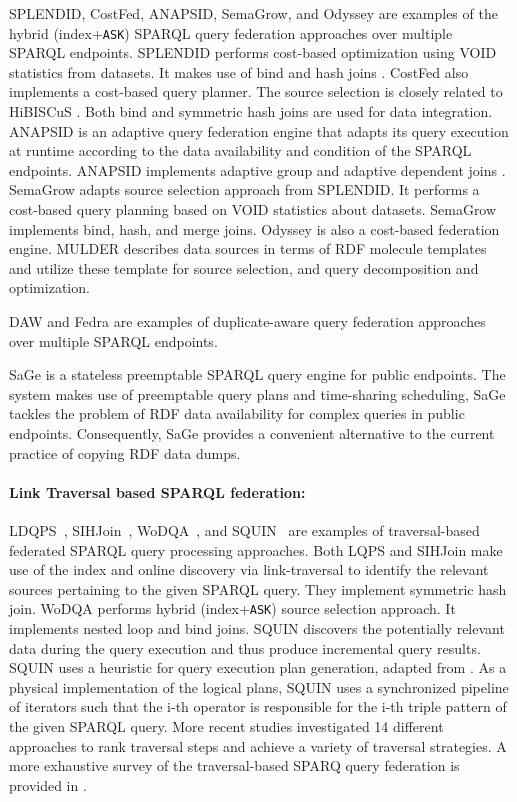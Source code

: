 SPLENDID, CostFed, ANAPSID, SemaGrow, and Odyssey are examples of the hybrid (index+\texttt{ASK}) SPARQL query federation approaches over multiple SPARQL endpoints. SPLENDID performs cost-based optimization using VOID statistics from datasets. It makes use of bind and hash joins \cite{saleem2015fine}. %
CostFed also implements a cost-based query planner. The source selection is closely related to HiBISCuS \cite{hibiscus2014}. Both bind and symmetric hash joins are used for data integration. ANAPSID \cite{anapsid2011} is an adaptive query federation engine that adapts its query execution at runtime according to the data availability and condition of the SPARQL endpoints.  ANAPSID implements adaptive group and adaptive dependent joins \cite{saleem2015fine}. SemaGrow adapts source selection approach from SPLENDID. It performs a cost-based query planning based on VOID statistics about datasets. SemaGrow implements bind, hash, and merge joins. Odyssey is also a cost-based federation engine. MULDER describes data sources in terms of RDF molecule templates and utilize these template for source selection, and query decomposition and optimization.

DAW \cite{daw2013} 
and Fedra \cite{fedra2015} are examples of duplicate-aware query federation approaches over multiple SPARQL endpoints. 

SaGe\cite{DBLP:journals/corr/abs-1806-00227} is a stateless preemptable SPARQL query engine for public endpoints. The system makes use of preemptable query plans and time-sharing scheduling, SaGe tackles the problem of RDF data availability for complex queries in public endpoints. Consequently, SaGe provides a convenient alternative to the current practice of copying RDF data dumps.

\paragraph*{\textbf{Link Traversal based SPARQL federation:}} LDQPS~\cite{ldqp2010}, SIHJoin~\cite{sihjoin2011}, WoDQA~\cite{wodqa2012}, and SQUIN~\cite{hartig2013squin} are examples of traversal-based federated SPARQL query processing approaches.  
Both LQPS and SIHJoin make use of the index and  online discovery via link-traversal to identify the relevant sources pertaining to the given SPARQL query. They implement symmetric hash join. WoDQA performs hybrid (index+\texttt{ASK}) source selection approach. It implements nested loop and bind joins. SQUIN discovers the potentially relevant data during the query execution and thus produce incremental query results. SQUIN uses a heuristic for query execution plan generation, adapted from \cite{zk2011}. As a physical implementation of the logical plans, SQUIN uses a synchronized pipeline of iterators such that the i-th operator is responsible for the i-th triple pattern of the given SPARQL query. More recent studies \cite{hartig2016walking} investigated 14 different approaches to rank traversal steps and achieve a variety of traversal strategies. 
A more exhaustive survey of the traversal-based SPARQ query federation is provided in \cite{hartig2009executing}. 

